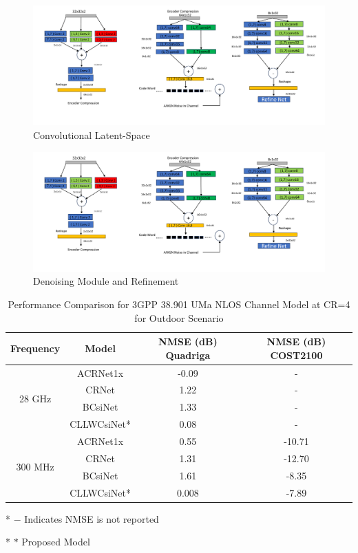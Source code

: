 \documentclass[lettersize,journal]{IEEEtran}
\begin{document}
\begin{figure}[ht]
	\centering
	\includegraphics[width=0.8\linewidth]{Model_b.pdf}
	\caption{Convolutional Latent-Space}
	\label{fig:figure2}
\end{figure}

\begin{figure}[ht]
	\centering
	\includegraphics[width=0.8\linewidth]{Model_c.pdf}
	\caption{Denoising Module and Refinement}
	\label{fig:figure3}
\end{figure}



	
	\begin{table}[ht]
		\centering
		\caption{Performance Comparison for 3GPP 38.901 UMa NLOS Channel Model at CR=4 for Outdoor Scenario}
		\label{table:performance_comparison}
		\begin{threeparttable}
			\begin{tabular}{cccc}
				\toprule
				\textbf{Frequency} & \textbf{Model} & \textbf{NMSE (dB) Quadriga} & \textbf{NMSE (dB) COST2100} \\
				\midrule
				\multirow{4}{*}{28 GHz} & ACRNet1x\cite{abx} & -0.09 & - \\
				& CRNet\cite{abn} & 1.22 & - \\
				& BCsiNet\cite{abp} & 1.33 & - \\
				& CLLWCsiNet* & 0.08 & - \\
				\midrule
				\multirow{4}{*}{300 MHz} & ACRNet1x\cite{abx} & 0.55 & -10.71 \\
				& CRNet\cite{abn} & 1.31 & -12.70 \\
				& BCsiNet\cite{abp} & 1.61 & -8.35 \\
				& CLLWCsiNet* & 0.008 & -7.89 \\
				\bottomrule
			\end{tabular}
			\begin{tablenotes}
				\item[*] $ -$ Indicates NMSE is not reported
				\item[*] $ *$ Proposed Model
			\end{tablenotes}
		\end{threeparttable}
	\end{table}
	
\end{document}
